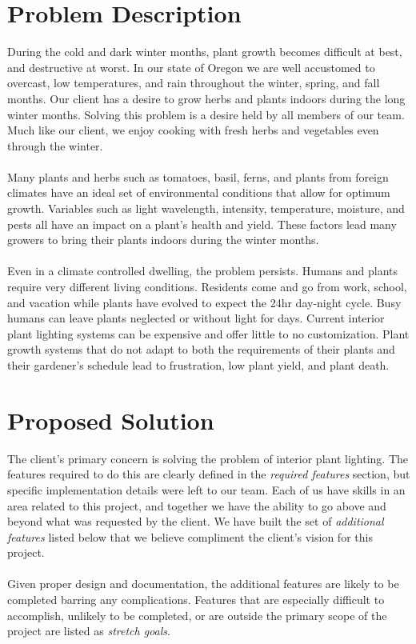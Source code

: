 \documentclass[onecolumn, draftclsnofoot,10pt, compsoc]{IEEEtran}
\begin{document}
	\section*{Problem Description}
	During the cold and dark winter months, plant growth becomes difficult at best, and destructive at worst. In our state of Oregon we are well accustomed to overcast, low temperatures, and rain throughout the winter, spring, and fall months. Our client has a desire to grow herbs and plants indoors during the long winter months. Solving this problem is a desire held by all members of our team. Much like our client, we enjoy cooking with fresh herbs and vegetables even through the winter.
	\\\\Many plants and herbs such as tomatoes, basil, ferns, and plants from foreign climates have an ideal set of environmental conditions that allow for optimum growth. Variables such as light wavelength, intensity, temperature, moisture, and pests all have an impact on a plant's health and yield. These factors lead many growers to bring their plants indoors during the winter months.
	\\\\Even in a climate controlled dwelling, the problem persists. Humans and plants require very different living conditions. Residents come and go from work, school, and vacation while plants have evolved to expect the 24hr day-night cycle. Busy humans can leave plants neglected or without light for days. Current interior plant lighting systems can be expensive and offer little to no customization. Plant growth systems that do not adapt to both the requirements of their plants and their gardener's schedule lead to frustration, low plant yield, and plant death.

	\section*{Proposed Solution}
	The client's primary concern is solving the problem of interior plant lighting. The features required to do this are clearly defined in the \textit{required features} section, but specific implementation details were left to our team. Each of us have skills in an area related to this project, and together we have the ability to go above and beyond what was requested by the client. We have built the set of \textit{additional features} listed below that we believe compliment the client's vision for this project.
	\\\\ Given proper design and documentation, the additional features are likely to be completed barring any complications. Features that are especially difficult to accomplish, unlikely to be completed, or are outside the primary scope of the project are listed as \textit{stretch goals}.
\end{document}
